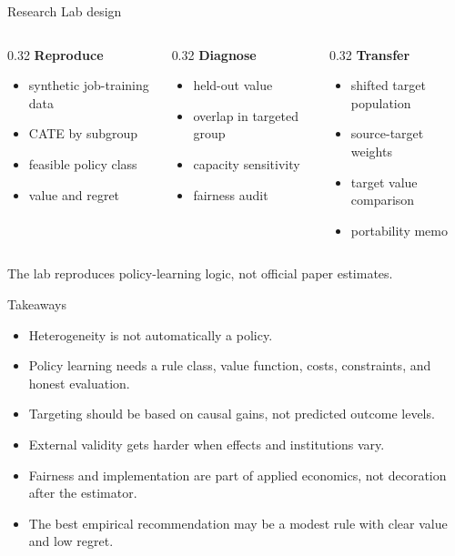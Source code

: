 \documentclass[aspectratio=169,11pt]{beamer}
\newcommand{\1}{\mathbf{1}}
\begin{document}
\begin{frame}{Research Lab design}
\begin{columns}[T,onlytextwidth]
\begin{column}{0.32\linewidth}
\textbf{Reproduce}
\begin{itemize}
    \item synthetic job-training data
    \item CATE by subgroup
    \item feasible policy class
    \item value and regret
\end{itemize}
\end{column}
\begin{column}{0.32\linewidth}
\textbf{Diagnose}
\begin{itemize}
    \item held-out value
    \item overlap in targeted group
    \item capacity sensitivity
    \item fairness audit
\end{itemize}
\end{column}
\begin{column}{0.32\linewidth}
\textbf{Transfer}
\begin{itemize}
    \item shifted target population
    \item source-target weights
    \item target value comparison
    \item portability memo
\end{itemize}
\end{column}
\end{columns}

\medskip
The lab reproduces policy-learning logic, not official paper estimates.
\end{frame}

\begin{frame}{Takeaways}
\begin{itemize}
    \item Heterogeneity is not automatically a policy.
    \item Policy learning needs a rule class, value function, costs, constraints, and honest evaluation.
    \item Targeting should be based on causal gains, not predicted outcome levels.
    \item External validity gets harder when effects and institutions vary.
    \item Fairness and implementation are part of applied economics, not decoration after the estimator.
    \item The best empirical recommendation may be a modest rule with clear value and low regret.
\end{itemize}
\end{frame}
\end{document}
